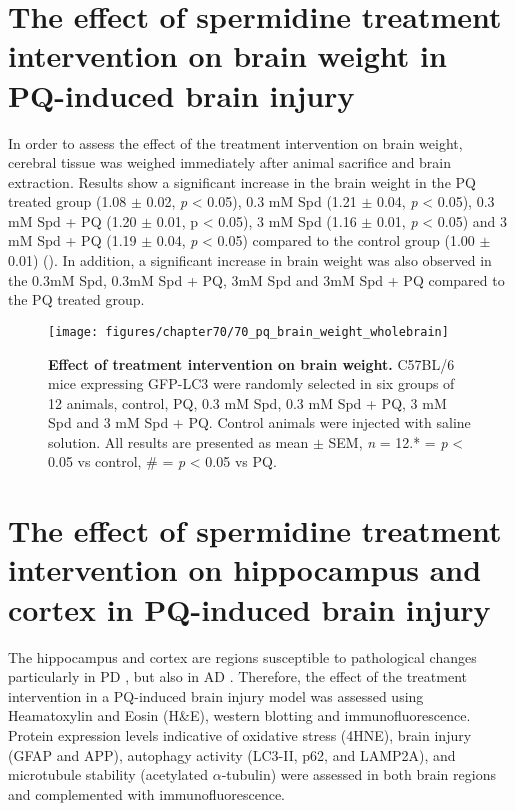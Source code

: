 \section{The effect of spermidine treatment intervention on brain weight in PQ-induced brain injury}
In order to assess the effect of the treatment intervention on brain weight, cerebral tissue was weighed immediately after animal sacrifice and brain extraction. Results show a significant increase in the brain weight in the PQ treated group (1.08 $\pm$ 0.02, \textit{p} < 0.05), 0.3 mM Spd (1.21 $\pm$ 0.04, \textit{p} < 0.05), 0.3 mM Spd + PQ (1.20 $\pm$ 0.01, p < 0.05), 3 mM Spd (1.16 $\pm$ 0.01, \textit{p} < 0.05) and 3 mM Spd + PQ (1.19 $\pm$ 0.04, \textit{p} < 0.05) compared to the control group (1.00 $\pm$ 0.01) (). In addition, a significant increase in brain weight was also observed in the 0.3mM Spd, 0.3mM Spd + PQ, 3mM Spd and 3mM Spd + PQ compared to the PQ treated group. 

\begin{figure}[!htbp]
\center
  \texttt{[image: figures/chapter70/70\_pq\_brain\_weight\_wholebrain]}
  \caption[Effect of treatment intervention on brain weight]{\textbf{Effect of treatment intervention on brain weight.} C57BL/6 mice expressing GFP-LC3 were randomly selected in six groups of 12 animals, control, PQ, 0.3 mM Spd, 0.3 mM Spd + PQ, 3 mM Spd and 3 mM Spd + PQ. Control animals were injected with saline solution. All results are presented as mean $\pm$ SEM, \textit{n} = 12.* = \textit{p} < 0.05 vs control, \# = \textit{p} < 0.05 vs PQ.}
  \label{fig:70_pq_brain_weight_wholebrain}
\end{figure} 

\section{The effect of spermidine treatment intervention on hippocampus and cortex in PQ-induced brain injury}
The hippocampus and cortex are regions susceptible to pathological changes particularly in PD \citep{Braak2004, Braak1998}, but also in AD \citep{Braak2004,Braak1998,Braak1991,Braak2012}. Therefore, the effect of the treatment intervention in a PQ-induced brain injury model was assessed using Heamatoxylin and Eosin (H\&E), western blotting and immunofluorescence. Protein expression levels indicative of oxidative stress (4HNE), brain injury (GFAP and APP), autophagy activity (LC3-II, p62, and LAMP2A), and microtubule stability (acetylated $\alpha$-tubulin) were assessed in both brain regions and complemented with immunofluorescence.

